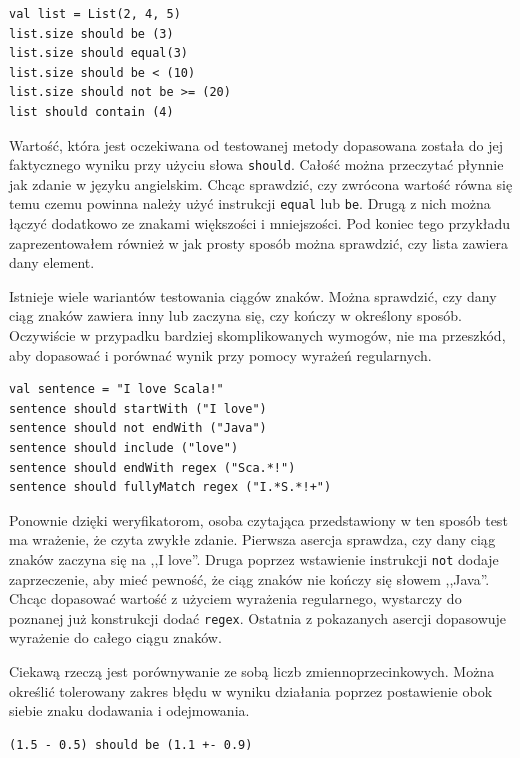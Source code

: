\documentclass[brudnopis]{xmgr}
\begin{document}
\begin{verbatim}
val list = List(2, 4, 5)
list.size should be (3)
list.size should equal(3)
list.size should be < (10)
list.size should not be >= (20)
list should contain (4)
\end{verbatim}

Wartość, która jest oczekiwana od testowanej metody dopasowana została do jej faktycznego wyniku przy użyciu słowa \texttt{should}. Całość można przeczytać płynnie jak zdanie w języku angielskim. 
Chcąc sprawdzić, czy zwrócona wartość równa się temu czemu powinna należy użyć instrukcji \texttt{equal} lub \texttt{be}. Drugą z nich można łączyć dodatkowo ze znakami większości i mniejszości. Pod koniec tego przykładu zaprezentowałem również w jak prosty sposób można sprawdzić, czy lista zawiera dany element.

Istnieje wiele wariantów testowania ciągów znaków. Można sprawdzić, czy dany ciąg znaków zawiera inny lub zaczyna się, czy kończy w określony sposób. Oczywiście w przypadku bardziej skomplikowanych wymogów, nie ma przeszkód, aby dopasować i porównać wynik przy pomocy wyrażeń regularnych.

\begin{verbatim}
val sentence = "I love Scala!"
sentence should startWith ("I love")
sentence should not endWith ("Java")
sentence should include ("love")
sentence should endWith regex ("Sca.*!")
sentence should fullyMatch regex ("I.*S.*!+")
\end{verbatim}

Ponownie dzięki weryfikatorom, osoba czytająca przedstawiony w ten sposób test ma wrażenie, że czyta zwykłe zdanie. Pierwsza asercja sprawdza, czy dany ciąg znaków zaczyna się na ,,I love''. Druga poprzez wstawienie instrukcji \texttt{not} dodaje zaprzeczenie, aby mieć pewność, że ciąg znaków nie kończy się słowem ,,Java''. Chcąc dopasować wartość z użyciem wyrażenia regularnego, wystarczy do poznanej już konstrukcji dodać \texttt{regex}. Ostatnia z pokazanych asercji dopasowuje wyrażenie do całego ciągu znaków.

Ciekawą rzeczą jest porównywanie ze sobą liczb zmiennoprzecinkowych. Można określić tolerowany zakres błędu w wyniku działania poprzez postawienie obok siebie znaku dodawania i odejmowania.

\begin{verbatim}
(1.5 - 0.5) should be (1.1 +- 0.9)
\end{verbatim}
\end{document}

